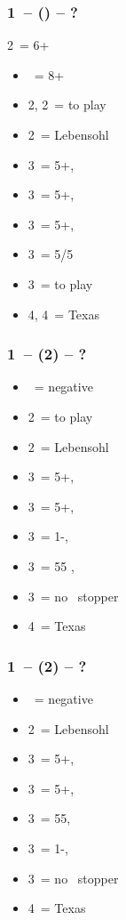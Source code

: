 \documentclass[12pt, a4paper]{article}
\begin{document}
\subsubsection*{1\ntx\ -- (\alrts{2\diams}) -- ?}
2\diams\ = 6+ \major
\begin{itemize}
    \item \dbl\ = 8+
    \item 2\hearts, 2\spades\ = to play
    \item 2\nt\ = Lebensohl
    \item 3\clubs\ = 5+\diams, \invp
    \item 3\diams\ = 5+\hearts, \invp
    \item 3\hearts\ = 5+\spades, \invp
    \item 3\spades\ = 5/5 \minor
    \item 3\nt\ = to play
    \item 4\diams, 4\hearts\ = Texas
\end{itemize}


\subsubsection*{1\ntx\ -- (2\hearts) -- ?}
\begin{itemize}
    \item \dbl\ = negative
    \item 2\spades\ = to play
    \item 2\nt\ = Lebensohl
    \item 3\clubs\ = 5+\diams, \invp
    \item 3\diams\ = 5+\spades, \invp
    \item 3\hearts\ = 1-\hearts, \invp
    \item 3\spades\ = 55 \minor, \gf
    \item 3\nt\ = no \hearts\ stopper
    \item 4\hearts\ = Texas
\end{itemize}

\subsubsection*{1\ntx\ -- (2\spades) -- ?}
\begin{itemize}
    \item \dbl\ = negative
    \item 2\nt\ = Lebensohl
    \item 3\clubs\ = 5+\diams, \invp
    \item 3\diams\ = 5+\hearts, \invp
    \item 3\hearts\ = 55\minor, \gf
    \item 3\spades\ = 1-\spades, \invp
    \item 3\nt\ = no \spades\ stopper
    \item 4\diams\ = Texas
\end{itemize}
\end{document}
